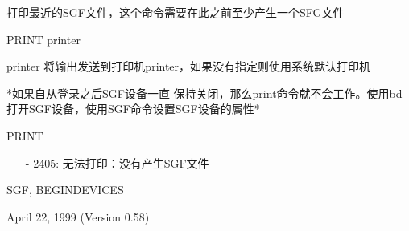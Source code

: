 \label{cmd:print}

打印最近的SGF文件，这个命令需要在此之前至少产生一个SFG文件

PRINT {printer}

printer 将输出发送到打印机printer，如果没有指定则使用系统默认打印机

*如果自从登录之后SGF设备一直 保持关闭，那么print命令就不会工作。使用bd打开SGF设备，使用SGF命令设置SGF设备的属性*

PRINT

\begin{itemize}
\item[-]2405: 无法打印：没有产生SGF文件
\end{itemize}

SGF, BEGINDEVICES

April 22, 1999 (Version 0.58)
